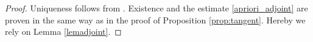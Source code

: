 \begin{proof}
{\color{red}Uniqueness follows from \cite[Proposition 15]{coron2003exact}. Existence and the estimate \eqref{apriori_adjoint} are proven in the same way as in the proof of Proposition \ref{prop:tangent}. Hereby we rely on Lemma \ref{lemadjoint}.}
\qquad\end{proof}







